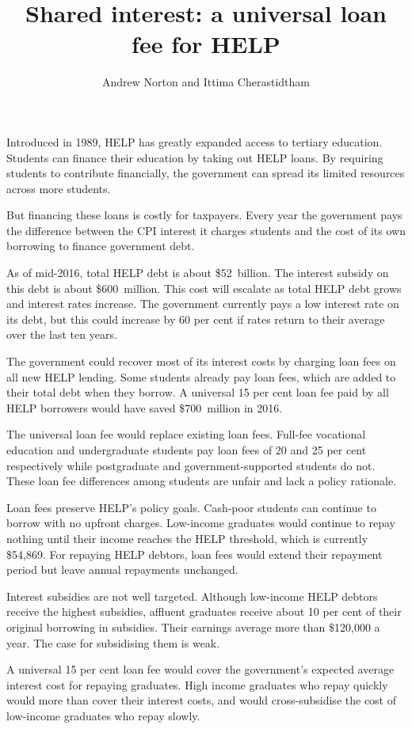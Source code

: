 \documentclass[embargoed]{grattan}
\title{Shared interest: a universal loan fee for \gls{HELP}}
\author{Andrew Norton and Ittima Cherastidtham}
\begin{document}
\setlength{\overviewExtra}{-3pt}
\begin{overview}
Introduced in 1989, \gls{HELP} has greatly expanded access to tertiary education.
Students can finance their education by taking out \gls{HELP} loans.
By requiring students to contribute financially, the government can spread its limited resources across more students.

But financing these loans is costly for taxpayers.
Every year the government pays the difference between the \gls{CPI} interest it charges students and the cost of its own borrowing to finance government debt.

As of mid-2016, total \gls{HELP} debt is about \$52~billion.
The interest subsidy on this debt is about \$600~million.
This cost will escalate as total \gls{HELP} debt grows and interest rates increase.
The government currently pays a low interest rate on its debt, but this could increase by 60 per cent if rates return to their average over the last ten years.

The government could recover most of its interest costs by charging loan fees on all new \gls{HELP} lending.
Some students already pay loan fees, which are added to their total debt when they borrow.
A universal 15 per cent loan fee paid by all \gls{HELP} borrowers would have saved \$700~million in 2016.

The universal loan fee would replace existing loan fees.
Full-fee vocational education and undergraduate students pay loan fees of 20 and 25 per cent respectively while postgraduate and government-supported students do not.
These loan fee differences among students are unfair and lack a policy rationale.

Loan fees preserve \gls{HELP}'s policy goals.
Cash-poor students can continue to borrow with no upfront charges.
Low-income graduates would continue to repay nothing until their income reaches the \gls{HELP} threshold, which is currently \$54,869.
For repaying \gls{HELP} debtors, loan fees would extend their repayment period but leave annual repayments unchanged.

Interest subsidies are not well targeted.
Although low-income \gls{HELP} debtors receive the highest subsidies, affluent graduates receive about 10 per cent of their original borrowing in subsidies.
Their earnings average more than \$120,000 a year.
The case for subsidising them is weak.

A universal 15 per cent loan fee would cover the government's expected average interest cost for repaying graduates.
High income graduates who repay quickly would more than cover their interest costs, and would cross-subsidise the cost of low-income graduates who repay slowly.


\end{overview}
\end{document}
